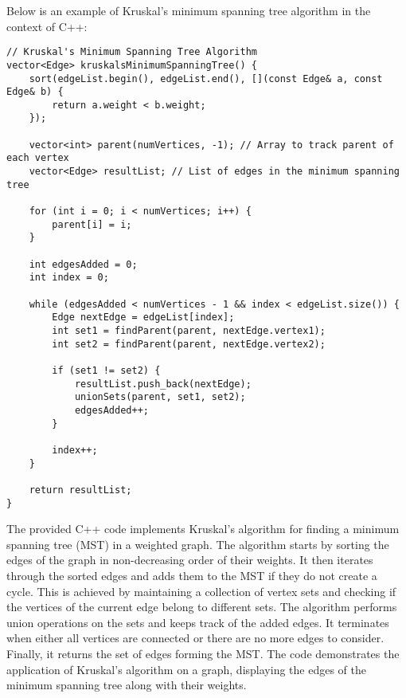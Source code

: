 \begin{solution}

Below is an example of Kruskal's minimum spanning tree algorithm in the context of C++:

\horizontalline

\begin{verbatim}
// Kruskal's Minimum Spanning Tree Algorithm
vector<Edge> kruskalsMinimumSpanningTree() {
    sort(edgeList.begin(), edgeList.end(), [](const Edge& a, const Edge& b) {
        return a.weight < b.weight;
    });

    vector<int> parent(numVertices, -1); // Array to track parent of each vertex
    vector<Edge> resultList; // List of edges in the minimum spanning tree

    for (int i = 0; i < numVertices; i++) {
        parent[i] = i;
    }

    int edgesAdded = 0;
    int index = 0;

    while (edgesAdded < numVertices - 1 && index < edgeList.size()) {
        Edge nextEdge = edgeList[index];
        int set1 = findParent(parent, nextEdge.vertex1);
        int set2 = findParent(parent, nextEdge.vertex2);

        if (set1 != set2) {
            resultList.push_back(nextEdge);
            unionSets(parent, set1, set2);
            edgesAdded++;
        }

        index++;
    }

    return resultList;
}
\end{verbatim}

\horizontalline

The provided C++ code implements Kruskal's algorithm for finding a minimum spanning tree (MST) in a weighted graph. The algorithm starts by sorting the edges of the graph in non-decreasing order of their weights. It then iterates 
through the sorted edges and adds them to the MST if they do not create a cycle. This is achieved by maintaining a collection of vertex sets and checking if the vertices of the current edge belong to different sets. The algorithm 
performs union operations on the sets and keeps track of the added edges. It terminates when either all vertices are connected or there are no more edges to consider. Finally, it returns the set of edges forming the MST. The code 
demonstrates the application of Kruskal's algorithm on a graph, displaying the edges of the minimum spanning tree along with their weights.
    
\end{solution}

